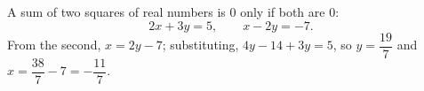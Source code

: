 A sum of two squares of real numbers is $0$ only if both are $0$:
\[
2x+3y=5,\qquad x-2y=-7 .
\]
From the second, $x=2y-7$; substituting, $4y-14+3y=5$, so $y=\dfrac{19}{7}$ and $x=\dfrac{38}{7}-7=\boxed{-\dfrac{11}{7}}$.
